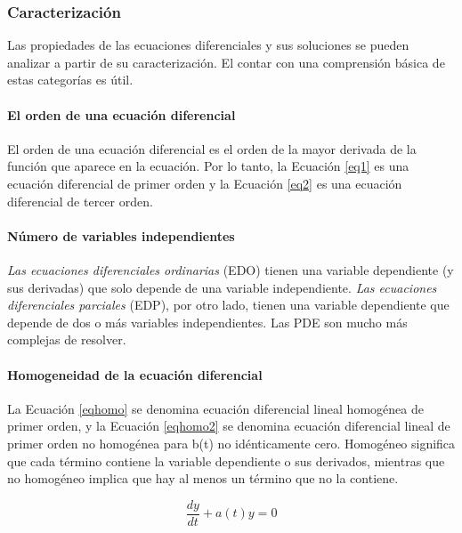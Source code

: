 \documentclass[11pt, letterpaper, spanish]{article}
\begin{document}
\subsubsection{Caracterización}

\par{Las propiedades de las ecuaciones diferenciales y sus soluciones se pueden analizar a partir de su caracterización. El contar con una comprensión básica de estas categorías es útil.}

    \paragraph{ El orden de una ecuación diferencial}
    
    \par{El orden de una ecuación diferencial es el orden de la mayor derivada de la función que aparece en la ecuación. Por lo tanto, la Ecuación \ref{eq1} es una ecuación diferencial de primer orden y la Ecuación \ref{eq2} es una ecuación diferencial de tercer orden.}

    \paragraph{ Número de variables independientes}
    
    \par{\textit{Las ecuaciones diferenciales ordinarias} (EDO) tienen una variable dependiente (y sus derivadas) que solo depende de una variable independiente.\textit{ Las ecuaciones diferenciales parciales} (EDP), por otro lado, tienen una variable dependiente que depende de dos o más variables independientes. Las PDE son mucho más complejas de resolver. }
    
    \paragraph{Homogeneidad de la ecuación diferencial}
    
    \par{La Ecuación \ref{eqhomo} se denomina ecuación diferencial lineal homogénea de primer orden, y la Ecuación \ref{eqhomo2} se denomina ecuación diferencial lineal de primer orden no homogénea para b(t) no idénticamente cero. Homogéneo significa que cada término contiene la variable dependiente o sus derivados, mientras que no homogéneo implica que hay al menos un término que no la contiene.}

     \begin{equation}
        \frac{d y}{d t}+a(t) y =0
        \label{eqhomo}
    \end{equation}
    
\end{document}
